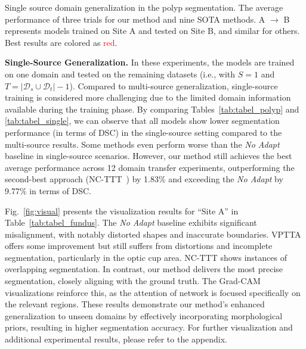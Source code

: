 \begin{table}[h!]
\centering
  \caption{Single source domain generalization in the polyp segmentation. The average performance of three trials for our method and nine SOTA methods. A $\rightarrow$ B represents models trained on Site A and tested on Site B, and similar for others. Best results are colored as \textcolor{red}{red}.}
  \vspace{-10pt}
  \begin{adjustbox}{width=0.99\linewidth}
    
  \end{adjustbox}
  \label{tab:tabel_single}
\end{table}
    
\noindent \textbf{Single-Source Generalization.} In these experiments, the models are trained on one domain and tested on the remaining datasets (i.e., with $S=1$ and $T=|\mathcal{D}_s \cup \mathcal{D}_t|-1$). Compared to multi-source generalization, single-source training is considered more challenging due to the limited domain information available during the training phase. By comparing Tables~\ref{tab:tabel_polyp} and \ref{tab:tabel_single}, we can observe that all models show lower segmentation performance (in terms of DSC) in the single-source setting compared to the multi-source results. Some methods even perform worse than the \textit{No Adapt} baseline in single-source scenarios.
However, our method still achieves the best average performance across 12 domain transfer experiments, outperforming the second-best approach (NC-TTT~\cite{osowiechi2024nc}) by 1.83\% and exceeding the \textit{No Adapt} by 9.77\% in terms of DSC. 

Fig.~\ref{fig:visual} presents the visualization results for ``Site A'' in Table~\ref{tab:tabel_fundus}. The \textit{No Adapt} baseline exhibits significant misalignment, with notably distorted shapes and inaccurate boundaries. VPTTA offers some improvement but still suffers from distortions and incomplete segmentation, particularly in the optic cup area. NC-TTT shows instances of overlapping segmentation. In contrast, our method delivers the most precise segmentation, closely aligning with the ground truth. The Grad-CAM~\cite{selvaraju2017grad} visualizations reinforce this, as the attention of network is focused specifically on the relevant regions. These results demonstrate our method's enhanced generalization to unseen domains by effectively incorporating morphological priors, resulting in higher segmentation accuracy. For further visualization and additional experimental results, please refer to the appendix.

